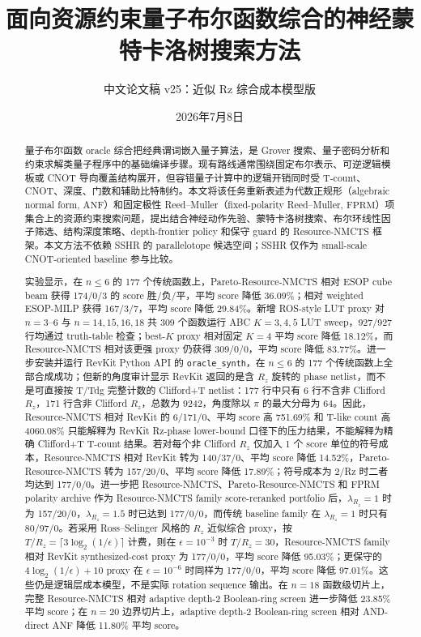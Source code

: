 \documentclass[UTF8,fontset=macnew,11pt]{ctexart}
\title{面向资源约束量子布尔函数综合的神经蒙特卡洛树搜索方法}
\author{中文论文稿 v25：近似 Rz 综合成本模型版}
\date{2026年7月8日}
\newcommand{\method}{Resource-NMCTS}
\newcommand{\screen}{Boolean-ring screen}
\newcommand{\anf}{\ensuremath{\mathrm{ANF}}}
\newcommand{\fprm}{\ensuremath{\mathrm{FPRM}}}
\begin{document}
\pagestyle{plain}
\maketitle

\begin{abstract}
量子布尔函数 oracle 综合把经典谓词嵌入量子算法，是 Grover 搜索、量子密码分析和约束求解类量子程序中的基础编译步骤。现有路线通常围绕固定布尔表示、可逆逻辑模板或 CNOT 导向覆盖结构展开，但容错量子计算中的逻辑开销同时受 T-count、CNOT、深度、门数和辅助比特制约。本文将该任务重新表述为代数正规形（algebraic normal form, \anf{}）和固定极性 Reed--Muller（fixed-polarity Reed--Muller, \fprm{}）项集合上的资源约束搜索问题，提出结合神经动作先验、蒙特卡洛树搜索、布尔环线性因子筛选、结构深度策略、depth-frontier policy 和保守 guard 的 \method{} 框架。本文方法不依赖 SSHR 的 parallelotope 候选空间；SSHR 仅作为 small-scale CNOT-oriented baseline 参与比较。

实验显示，在 $n\leq6$ 的 177 个传统函数上，Pareto-\method{} 相对 ESOP cube beam 获得 174/0/3 的 score 胜/负/平，平均 score 降低 36.09\%；相对 weighted ESOP-MILP 获得 167/3/7，平均 score 降低 29.84\%。新增 ROS-style LUT proxy 对 $n=3$--$6$ 与 $n=14,15,16,18$ 共 309 个函数运行 ABC $K=3,4,5$ LUT sweep，927/927 行均通过 truth-table 检查；best-$K$ proxy 相对固定 $K=4$ 平均 score 降低 18.12\%，而 \method{} 相对该更强 proxy 仍获得 309/0/0，平均 score 降低 83.77\%。进一步安装并运行 RevKit Python API 的 \texttt{oracle\_synth}，在 $n\leq6$ 的 177 个传统函数上全部合成成功；但新的角度审计显示 RevKit 返回的是含 $R_z$ 旋转的 phase netlist，而不是可直接按 T/Tdg 完整计数的 Clifford+T netlist：177 行中只有 6 行不含非 Clifford $R_z$，171 行含非 Clifford $R_z$，总数为 9242，角度除以 $\pi$ 的最大分母为 64。因此，\method{} 相对 RevKit 的 6/171/0、平均 score 高 751.69\% 和 T-like count 高 4060.08\% 只能解释为 RevKit Rz-phase lower-bound 口径下的压力结果，不能解释为精确 Clifford+T T-count 结果。若对每个非 Clifford $R_z$ 仅加入 1 个 score 单位的符号成本，\method{} 相对 RevKit 转为 140/37/0、平均 score 降低 14.52\%，Pareto-\method{} 转为 157/20/0、平均 score 降低 17.89\%；符号成本为 2/Rz 时二者均达到 177/0/0。进一步把 \method{}、Pareto-\method{} 和 FPRM polarity archive 作为 Resource-NMCTS family score-reranked portfolio 后，$\lambda_{R_z}=1$ 时为 157/20/0，$\lambda_{R_z}=1.5$ 时已达到 177/0/0，而传统 baseline family 在 $\lambda_{R_z}=1$ 时只有 80/97/0。若采用 Ross--Selinger 风格的 $R_z$ 近似综合 proxy，按 $T/R_z=\lceil 3\log_2(1/\epsilon)\rceil$ 计费，则在 $\epsilon=10^{-3}$ 时 $T/R_z=30$，Resource-NMCTS family 相对 RevKit synthesized-cost proxy 为 177/0/0，平均 score 降低 95.03\%；更保守的 $4\log_2(1/\epsilon)+10$ proxy 在 $\epsilon=10^{-6}$ 时同样为 177/0/0，平均 score 降低 97.01\%。这些仍是逻辑层成本模型，不是实际 rotation sequence 输出。在 $n=18$ 函数级切片上，完整 \method{} 相对 adaptive depth-2 \screen{} 进一步降低 23.85\% 平均 score；在 $n=20$ 边界切片上，adaptive depth-2 \screen{} 相对 AND-direct ANF 降低 11.80\% 平均 score。


\end{abstract}
\end{document}
